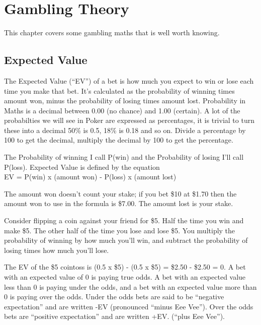 \chapter{Gambling Theory}


This chapter covers some gambling maths that is well worth knowing.

\section{Expected Value}

The Expected Value (``EV'') of a bet is how much you expect to win or lose
each time you make that bet. It's calculated as the probability of
winning times amount won, minus the probability of losing times amount
lost. Probability in Maths is a decimal between 0.00 (no chance)
and 1.00 (certain). A lot of the probabilties we will see in Poker
are expressed as percentages, it is trivial to turn these into a decimal
50\% is 0.5, 18\% is 0.18 and so on. Divide a
percentage by 100 to get the decimal, multiply the decimal by 100 to
get the percentage.

The Probability of winning I call P(win) and the Probability of losing
I'll call P(loss). Expected Value is defined by the equation \\
EV = P(win) x (amount won) - P(loss) x (amount lost)

The amount won doesn't count your stake; if you bet \$10 at \$1.70
then the amount won to use in the formula is \$7.00. The amount lost
is your stake.

Consider flipping a coin against your friend
for \$5. Half the time you win and make \$5. The other half of the
time you lose and lose \$5. You multiply the probability of winning
by how much you'll win, and subtract the probability of losing times
how much you'll lose.

The EV of the \$5 cointoss is (0.5 x \$5) - (0.5 x \$5)
= \$2.50 - \$2.50 = 0. A bet with an expected value of 0 is
paying true odds. A bet with an expected value less than 0 is
paying under the odds, and a bet with an expected value more than
0 is paying over the odds. Under the odds bets are said to be
``negative expectation'' and are written -EV (pronounced ``minus Eee Vee'').
Over the odds bets are ``positive expectation'' and are written +EV.
(``plus Eee Vee'').


